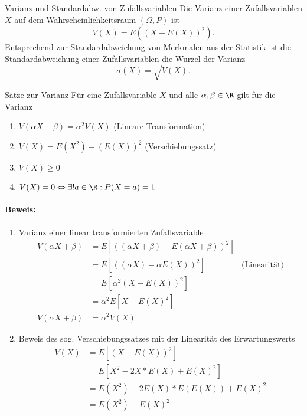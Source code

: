 \begin{definition}{Varianz und Standardabw. von Zufallsvariablen}
	Die Varianz einer Zufallsvariablen $X$ auf dem Wahrscheinlichkeitsraum $(\Omega,P)$ ist
	\begin{equation*}
		V(X)=E((X-E(X))^2).
	\end{equation*}
	Entsprechend zur Standardabweichung von Merkmalen aus der Statistik ist die Standardabweichung einer Zufallsvariablen die Wurzel der Varianz
	\begin{equation*}
		\sigma(X)=\sqrt{V(X)}.
	\end{equation*}
\end{definition}

\begin{satz}{Sätze zur Varianz}
	Für eine Zufallsvariable $X$ und alle $\alpha,\beta\in\R$ gilt für die Varianz
	\begin{enumerate}
		\item $V(\alpha X + \beta) = \alpha^2 V(X)$ (Lineare Transformation)
		\item $V(X)=E(X^2)-(E(X))^2$ (Verschiebungssatz)
		\item $V(X)\geq 0$
		\item $V(X)=0\Leftrightarrow   \exists!a\in\R: P(X=a)=1$
	\end{enumerate}
\end{satz}

\paragraph{Beweis:}
\begin{enumerate}
	\item Varianz einer linear transformierten Zufallsvariable
	\begin{align*}
		V(\alpha X + \beta)&=E[((\alpha X+\beta)-E(\alpha X+\beta))^2]\\
		&=E[((\alpha X)-\alpha E(X))^2] &\text{(Linearität)}\\
		&=E[\alpha^2(X-E(X))^2]\\ 
		&=\alpha^2E[X-E(X)^2]\\
		V(\alpha X + \beta)&=\alpha^2V(X)
	\end{align*}
	\item Beweis des sog. Verschiebungssatzes mit der Linearität des Erwartungswerts
	\begin{align*}
		V(X)&=E[(X-E(X))^2]\\
		&=E[X^2-2X*E(X)+E(X)^2]\\
		&=E(X^2)-2E(X)*E(E(X))+E(X)^2\\
		&=E(X^2)-E(X)^2\\
	\end{align*}
\end{enumerate}


